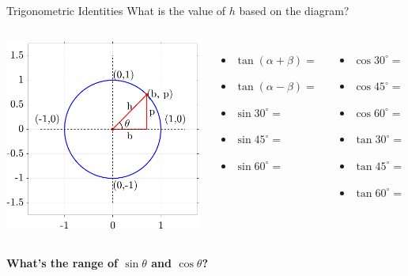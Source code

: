 \documentclass[aspectratio=169,xcolor=dvipsnames,svgnames,x11names,fleqn]{beamer}
\begin{document}
\begin{frame}{Trigonometric Identities}
What is the value of $h$ based on the diagram?
    \begin{columns}
        \includegraphics[width=0.99\linewidth, trim=2cm 2cm 1cm 1cm,clip]{figures/unit_circle_right_triangle.png}
        \begin{itemize} \setlength\itemsep{1.5em}
            \item $\tan(\alpha + \beta) = $

            \item $\tan(\alpha - \beta) = $

            \item $\sin 30^{\circ} = $
            \item $\sin 45^{\circ} = $
            \item $\sin 60^{\circ} = $

            \end{itemize}
\begin{itemize} \setlength\itemsep{1.5em}
            \item $\cos 30^{\circ} = $
            \item $\cos 45^{\circ} = $
            \item $\cos60^{\circ} = $

            \item $\tan 30^{\circ} = $
            \item $\tan 45^{\circ} = $
            \item $\tan60^{\circ} = $
            
        \end{itemize}
    \end{columns}

    \bigskip

\bf \centering
    What's the range of $\sin \theta$ and $\cos \theta$?
\end{frame}
\end{document}
